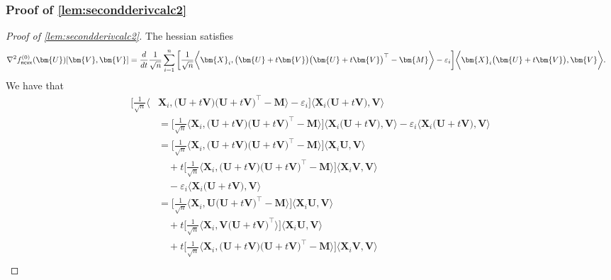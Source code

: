 \documentclass[10pt]{article}
\newcommand{\eps}{\ensuremath{\varepsilon}}
\renewcommand{\t}{^{\top}}
\theoremstyle{definition}
\begin{document}
\subsubsection{Proof of \cref{lem:secondderivcalc2}} \label{sec:secondderivcalc2proof}
\begin{proof}[Proof of \cref{lem:secondderivcalc2}]
    The hessian satisfies
\begin{align}
    \nabla^2 f^{(0)}_{{\sf ncvx}}(\bm{U})[\bm{V},\bm{V}] &= \frac{d}{dt} \frac{1}{\sqrt{n}} \sum_{i=1}^{n} \bigg[ \frac{1}{\sqrt{n}}\bigg\langle \bm{X}_i, \big( \bm{U} + t \bm{V} \big) \big( \bm{U} + t \bm{V} \big)\t - \bm{M} \bigg \rangle - \eps_i \bigg] \bigg \langle \bm{X}_i \big( \bm{U} + t \bm{V} \big), \bm{V} \bigg\rangle .
\end{align}
We have that
\begin{align}
     \bigg[ \frac{1}{\sqrt{n}}\bigg\langle &\bm{X}_i, \big( \bm{U} + t \bm{V} \big) \big( \bm{U} + t \bm{V} \big)\t - \bm{M} \bigg \rangle - \eps_i \bigg] \bigg \langle \bm{X}_i \big( \bm{U} + t \bm{V} \big), \bm{V} \bigg\rangle \\
     &=  \bigg[ \frac{1}{\sqrt{n}}\bigg\langle \bm{X}_i, \big( \bm{U} + t \bm{V} \big) \big( \bm{U} + t \bm{V} \big)\t - \bm{M} \bigg \rangle \bigg] \bigg \langle \bm{X}_i \big( \bm{U} + t \bm{V} \big), \bm{V} \bigg\rangle  - \eps_i\bigg \langle \bm{X}_i \big( \bm{U} + t \bm{V} \big), \bm{V} \bigg\rangle \\
     &=  \bigg[ \frac{1}{\sqrt{n}}\bigg\langle \bm{X}_i, \big( \bm{U} + t \bm{V} \big) \big( \bm{U} + t \bm{V} \big)\t - \bm{M} \bigg \rangle \bigg] \bigg \langle \bm{X}_i  \bm{U} , \bm{V} \bigg\rangle \\
     &\quad+ t \bigg[ \frac{1}{\sqrt{n}}\bigg\langle \bm{X}_i, \big( \bm{U} + t \bm{V} \big) \big( \bm{U} + t \bm{V} \big)\t - \bm{M} \bigg \rangle \bigg] \bigg \langle \bm{X}_i  \bm{V} , \bm{V} \bigg\rangle \\
     &\quad  - \eps_i\bigg \langle \bm{X}_i \big( \bm{U} + t \bm{V} \big), \bm{V} \bigg\rangle
     \\
     &=  \bigg[ \frac{1}{\sqrt{n}}\bigg\langle \bm{X}_i,  \bm{U}  \big( \bm{U} + t \bm{V} \big)\t - \bm{M} \bigg \rangle \bigg] \bigg \langle \bm{X}_i  \bm{U} , \bm{V} \bigg\rangle \\
&\quad +     t \bigg[\frac{1}{\sqrt{n}} \bigg\langle \bm{X}_i,   \bm{V}  \big( \bm{U} + t \bm{V} \big)\t \bigg \rangle \bigg] \bigg \langle \bm{X}_i  \bm{U} , \bm{V} \bigg\rangle \\
     &\quad+ t \bigg[ \frac{1}{\sqrt{n}}\bigg\langle \bm{X}_i, \big( \bm{U} + t \bm{V} \big) \big( \bm{U} + t \bm{V} \big)\t - \bm{M} \bigg \rangle \bigg] \bigg \langle \bm{X}_i  \bm{V} , \bm{V} \bigg\rangle \\

\end{align}
\end{proof}
\end{document}

